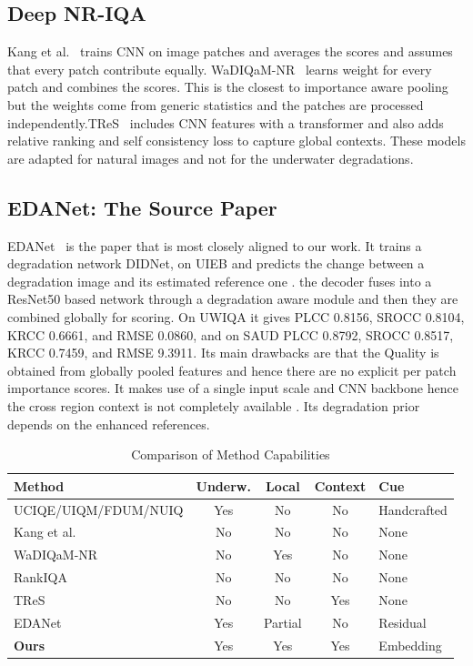 \documentclass[conference]{IEEEtran}
\begin{document}
\subsection{Deep NR-IQA}

Kang et al.~\cite{kang2014} trains CNN on image patches and averages the scores and assumes that every patch contribute equally. WaDIQaM-NR~\cite{bosse2018} learns  weight for every patch and combines  the scores. This is the closest to importance aware pooling but the weights come from generic statistics and the patches are processed independently.TReS~\cite{golestaneh2022tres} includes CNN features with a transformer and also adds relative ranking and self consistency loss to capture global contexts. These models are adapted for natural images and not for the  underwater degradations.
\vspace{0.3cm}
\subsection{EDANet: The Source Paper}

EDANet~\cite{jiang2025eda} is the paper that is most closely aligned to our work. It trains a degradation network DIDNet, on UIEB and predicts the change between a degradation image and its estimated reference one . the decoder fuses into a ResNet50 based network through a degradation aware module and then they are combined globally for scoring. On UWIQA it gives PLCC 0.8156, SROCC 0.8104, KRCC 0.6661, and RMSE 0.0860, and on SAUD PLCC 0.8792, SROCC 0.8517, KRCC 0.7459, and RMSE 9.3911. Its main drawbacks are that the Quality is obtained from globally pooled features and hence there are no explicit per patch importance scores. It makes use of  a single input scale and CNN backbone hence the cross region context is not completely available . Its degradation prior depends on the enhanced references.

\begin{table}[H]
\centering
\caption{Comparison of Method Capabilities}
\label{tab:related}
\footnotesize
\setlength{\tabcolsep}{3pt}
\begin{tabular}{lcccl}
\toprule
Method & Underw. & Local & Context & Cue \\
\midrule
UCIQE/UIQM/FDUM/NUIQ & Yes & No & No & Handcrafted \\
Kang et al. & No & No & No & None \\
WaDIQaM-NR & No  & Yes & No & None \\
RankIQA    & No  & No  & No & None \\
TReS       & No  & No  & Yes & None \\
EDANet     & Yes & Partial & No & Residual \\
\textbf{Ours} & Yes & Yes & Yes & Embedding \\
\bottomrule
\end{tabular}
\end{table}
\vspace{0.3cm}
\end{document}
